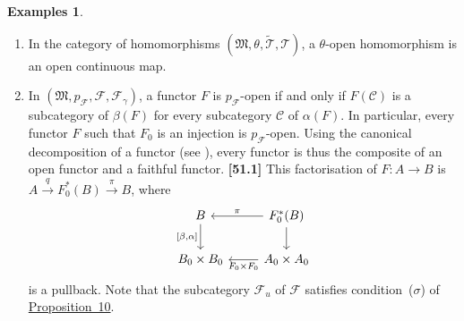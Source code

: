 \documentclass[a4paper,fleqn]{article}
\theoremstyle{plain}
\theoremstyle{definition}
\newtheorem*{examples}{Examples}
\newenvironment{longcomm}[1]
  {\noindent\textbf{[#1]}\rmfamily}
  {}
\newcommand{\CC}{\mathcal{C}}
\newcommand{\MM}{\mathfrak{M}}
\newcommand{\FF}{\mathcal{F}}
\newcommand{\TT}{\mathcal{T}}
\newcommand{\tTT}{\widetilde{\TT}}
\begin{document}
\begin{examples}
  \begin{enumerate}
    \item
      In the category of homomorphisms $(\MM,\theta,\tTT,\TT)$, a $\theta$-open homomorphism is an open continuous map.

    \item
      In $(\MM,p_\FF,\FF,\FF_\gamma)$, a functor $F$ is $p_\FF$-open if and only if $F(\CC)$ is a subcategory of $\beta(F)$ for every subcategory $\CC$ of $\alpha(F)$.
      In particular, every functor $F$ such that $F_0$ is an injection is $p_\FF$-open.
      Using the canonical decomposition of a functor (see \cite{3a}), every functor is thus the composite of an open functor and a faithful functor.
      \begin{longcomm}{51.1}
        This factorisation of $F\colon A\to B$ is $A\xrightarrow{q}F_0^*(B)\xrightarrow{\pi}B$, where
        \[
          \begin{tikzcd}
            B \ar[d,swap,"{[\beta,\alpha]}"]
            & F_0^*(B) \ar[l,swap,"\pi"] \ar[d]
          \\B_0\times B_0
            & A_0\times A_0 \ar[l,"F_0\times F_0"]
          \end{tikzcd}
        \]
        is a pullback.
      \end{longcomm}
      Note that the subcategory $\FF_u$ of $\FF$ satisfies condition~($\sigma$) of \hyperref[proposition:i-10]{Proposition~10}.
  \end{enumerate}
\end{examples}
\end{document}
